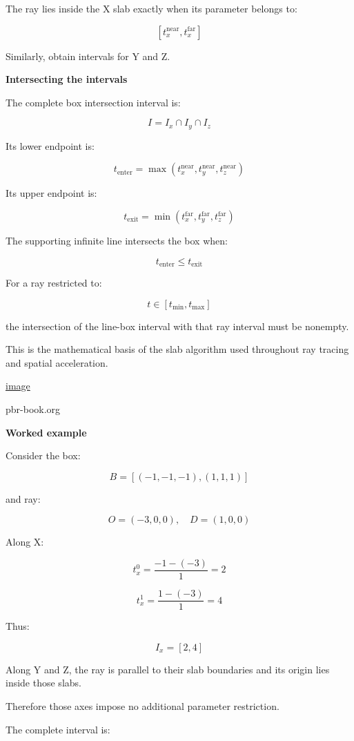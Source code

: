 The ray lies inside the X slab exactly when its parameter belongs to:

\[
[t_x^{\mathrm{near}},t_x^{\mathrm{far}}]
\]

Similarly, obtain intervals for Y and Z.

\textbf{Intersecting the intervals}

The complete box intersection interval is:

\[
I=I_x\cap I_y\cap I_z
\]

Its lower endpoint is:

\[
\boxed{ t_{\mathrm{enter}}= \max(t_x^{\mathrm{near}},t_y^{\mathrm{near}},t_z^{\mathrm{near}}) }
\]

Its upper endpoint is:

\[
\boxed{ t_{\mathrm{exit}}= \min(t_x^{\mathrm{far}},t_y^{\mathrm{far}},t_z^{\mathrm{far}}) }
\]

The supporting infinite line intersects the box when:

\[
\boxed{ t_{\mathrm{enter}}\le t_{\mathrm{exit}} }
\]

For a ray restricted to:

\[
t\in[t_{\min},t_{\max}]
\]

the intersection of the line-box interval with that ray interval must be nonempty.

This is the mathematical basis of the slab algorithm used throughout ray tracing and spatial acceleration. 

\href{https://www.google.com/s2/favicons?domain=https://www.pbr-book.org&sz=32}{image}

pbr-book.org

\textbf{Worked example}

Consider the box:

\[
B=[(-1,-1,-1),(1,1,1)]
\]

and ray:

\[
O=(-3,0,0),\quad D=(1,0,0)
\]

Along X:

\[
t_x^0=\frac{-1-(-3)}1=2
\]

\[
t_x^1=\frac{1-(-3)}1=4
\]

Thus:

\[
I_x=[2,4]
\]

Along Y and Z, the ray is parallel to their slab boundaries and its origin lies inside those slabs.

Therefore those axes impose no additional parameter restriction.

The complete interval is:

